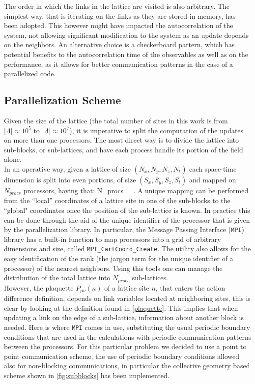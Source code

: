The order in which the links in the lattice are visited is also arbitrary. The simplest way, that is iterating on the links as they are stored in memory, has been adopted. This however might have impacted the autocorrelation of the system, not allowing significant modification to the system as an update depends on the neighbors. An alternative choice is a checkerboard pattern, which has potential benefits to the autocorrelation time of the observables as well as on the performance, as it allows for better communication patterns in the case of a parallelized code. 

\subsection{Parallelization Scheme}
\label{sec:para_gen}
Given the size of the lattice (the total number of sites in this work is from $|\Lambda| \approx 10^5$ to $|\Lambda|\approx 10^7$), it is imperative to split the computation of the updates on more than one processors. The most direct way is to divide the lattice into sub-blocks, or sub-lattices, and have each process handle its portion of the field alone. \\
In an operative way, given a lattice of size $(N_x, N_y, N_z, N_t)$ each space-time dimension is split into even portions, of size $(S_x, S_y, S_z, S_t)$ and mapped on $N_{procs}$ processors, having that:
\beq
N_{procs} =  \times {} \times {}  \times {}.
\eeq 
A unique mapping can be performed from the ``local'' coordinates of a lattice site in one of the sub-blocks to the ``global" coordinates once the position of the sub-lattice is known. In practice this can be done through the aid of the unique identifier of the processor that is given by the parallelization library. In particular, the Message Passing Interface (\texttt{MPI}) \cite{Forum:1994:MMI:898758} library has a built-in function to map processors into a grid of arbitrary dimensions and size, called \texttt{MPI\_CartCoord\_Create}. The utility also allows for the easy identification of the rank (the jargon term for the unique identifier of a processor) of the nearest neighbors. Using this tools one can manage the distribution of the total lattice into $N_{procs}$ sub-lattices. \\
However, the plaquette $P_{\mu\nu}(n)$ of a lattice site $n$, that enters the action difference definition, depends on link variables located at neighboring sites, this is clear by looking at the definition found in \cref{plaquette}. This implies that when updating a link on the edge of a sub-lattice, information about another block is needed. Here is where \texttt{MPI} comes in use, substituting the usual periodic boundary conditions that are used in the calculations with periodic communication patterns between the processors. For this particular problem we decided to use a point to point communication scheme, the use of periodic boundary conditions allowed also for non-blocking communications, in particular the collective geometry based scheme shown in \cref{fig:subblocks} has been implemented. 

